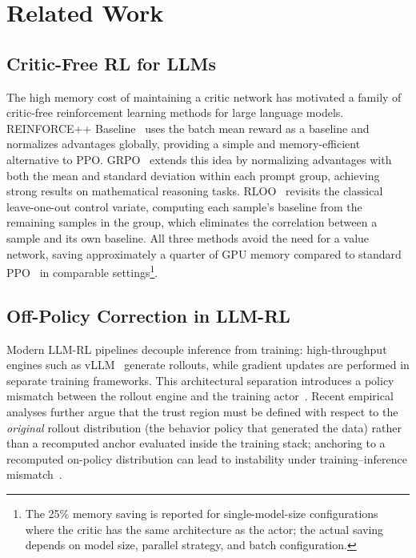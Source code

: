 \section{Related Work}
\label{sec:related}

\subsection{Critic-Free RL for LLMs}

The high memory cost of maintaining a critic network has motivated a family of critic-free reinforcement learning methods for large language models. REINFORCE++ Baseline~\citep{hu2025reinforce} uses the batch mean reward as a baseline and normalizes advantages globally, providing a simple and memory-efficient alternative to PPO. GRPO~\citep{shao2024deepseekmath} extends this idea by normalizing advantages with both the mean and standard deviation within each prompt group, achieving strong results on mathematical reasoning tasks. RLOO~\citep{ahmadian2024back} revisits the classical leave-one-out control variate, computing each sample's baseline from the remaining samples in the group, which eliminates the correlation between a sample and its own baseline. All three methods avoid the need for a value network, saving approximately a quarter of GPU memory compared to standard PPO~\citep{schulman2017proximal} in comparable settings\footnote{The 25\% memory saving is reported for single-model-size configurations where the critic has the same architecture as the actor; the actual saving depends on model size, parallel strategy, and batch configuration.}.

\subsection{Off-Policy Correction in LLM-RL}

Modern LLM-RL pipelines decouple inference from training: high-throughput engines such as vLLM~\citep{kwon2023efficient} generate rollouts, while gradient updates are performed in separate training frameworks. This architectural separation introduces a policy mismatch between the rollout engine and the training actor~\citep{yao2025offpolicy}.
Recent empirical analyses further argue that the trust region must be defined with respect to the \emph{original} rollout distribution (the
behavior policy that generated the data) rather than a recomputed anchor evaluated inside the training stack; anchoring to a recomputed
on-policy distribution can lead to instability under training--inference mismatch~\citep{qi2026rethinkingtrustregionllm}.

